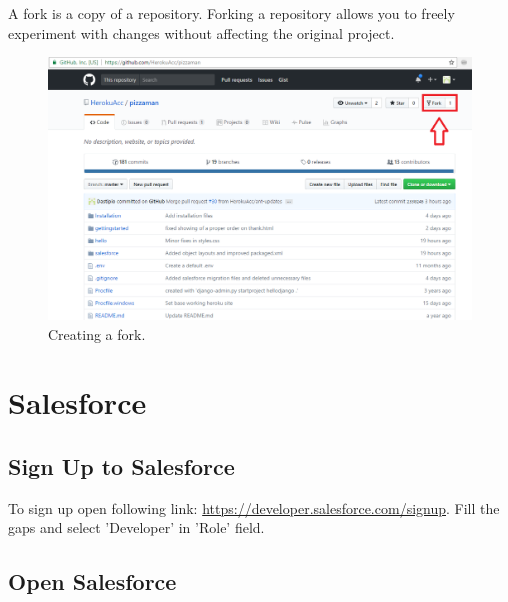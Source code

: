 \documentclass[12pt,a4paper]{article}
\begin{document}
\begin{itemize}
A fork is a copy of a repository. Forking a repository allows you to freely experiment with changes without affecting the original project.

\begin{figure}[H]
	\centering
	\includegraphics[width = 1 \textwidth]{images/fork.PNG}
	\caption{Creating a fork.}
	\label{fig:fork}
\end{figure}



\end{itemize}

\section{Salesforce}
\subsection{Sign Up to Salesforce}
To sign up open following link: \url{https://developer.salesforce.com/signup}.
Fill the gaps and select 'Developer' in 'Role' field.

\subsection{Open Salesforce}
\end{document}
